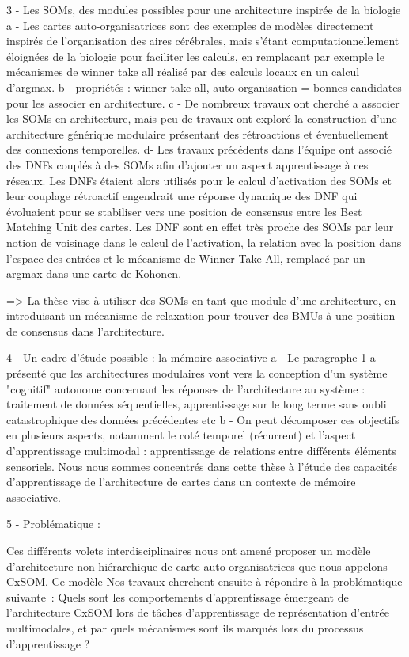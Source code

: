 3 - Les SOMs, des modules possibles pour une architecture inspirée de la biologie
    a - Les cartes auto-organisatrices sont des exemples de modèles directement inspirés de l'organisation des aires cérébrales, mais s'étant computationnellement éloignées de la biologie pour faciliter les calculs, en remplacant par exemple le mécanismes de winner take all réalisé par des calculs locaux en un calcul d'argmax.
    b - propriétés : winner take all, auto-organisation = bonnes candidates pour les associer en architecture.
    c - De nombreux travaux ont cherché a associer les SOMs en architecture, mais peu de travaux ont exploré la construction d'une architecture générique modulaire présentant des rétroactions et éventuellement des connexions temporelles. 
    d- Les travaux précédents dans l'équipe ont associé des DNFs couplés à des SOMs afin d'ajouter un aspect apprentissage à ces réseaux. Les DNFs étaient alors utilisés pour le calcul d'activation des SOMs et leur couplage rétroactif engendrait une réponse dynamique des DNF qui évoluaient pour se stabiliser vers une position de consensus entre les Best Matching Unit des cartes. Les DNF sont en effet très proche des SOMs par leur notion de voisinage dans le calcul de l'activation, la relation avec la position dans l'espace des entrées et le mécanisme de Winner Take All, remplacé par un argmax dans une carte de Kohonen.

=> La thèse vise à utiliser des SOMs en tant que module d'une architecture, en introduisant un mécanisme de relaxation pour trouver des BMUs à une position de consensus dans l'architecture. 

4 - Un cadre d'étude possible : la mémoire associative 
    a - Le paragraphe 1 a présenté que les architectures modulaires vont vers la conception d'un système "cognitif" autonome concernant les réponses de l'architecture au système : traitement de données séquentielles, apprentissage sur le long terme sans oubli catastrophique des  données précédentes etc
    b - On peut décomposer ces objectifs en plusieurs aspects, notamment le coté temporel (récurrent) et l'aspect d'apprentissage multimodal : apprentissage de relations entre différents éléments sensoriels.
    Nous nous sommes concentrés dans cette thèse à l'étude des capacités d'apprentissage de l'architecture de cartes dans un contexte de mémoire associative.

5 - Problématique : 

Ces différents volets interdisciplinaires nous ont amené proposer un modèle d'architecture non-hiérarchique de carte auto-organisatrices que nous appelons CxSOM. Ce modèle 
Nos travaux cherchent ensuite à répondre à la problématique suivante~: 
Quels sont les comportements d'apprentissage émergeant de l'architecture CxSOM lors de tâches d'apprentissage de représentation d'entrée multimodales, et par quels mécanismes sont ils marqués lors du processus d'apprentissage ? 

